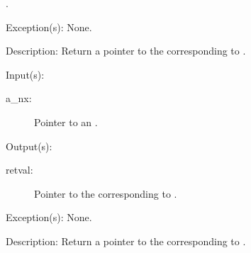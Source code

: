 \begin{capi}
\begin{capilist}
\begin{description}
			.
		\end{description}
	\item[Exception(s): ] None.
	\item[Description: ]
		Return a pointer to the  corresponding to
		.
	\end{capilist}
\label{nx_stderr_get}
	\begin{capilist}
	\item[Input(s): ]
		\begin{description}\item[]
		\item[a\_nx: ]
			Pointer to an .
		\end{description}
	\item[Output(s): ]
		\begin{description}\item[]
		\item[retval: ]
			Pointer to the  corresponding to
			.
		\end{description}
	\item[Exception(s): ] None.
	\item[Description: ]
		Return a pointer to the  corresponding to
		.
	\end{capilist}
\end{capi}
